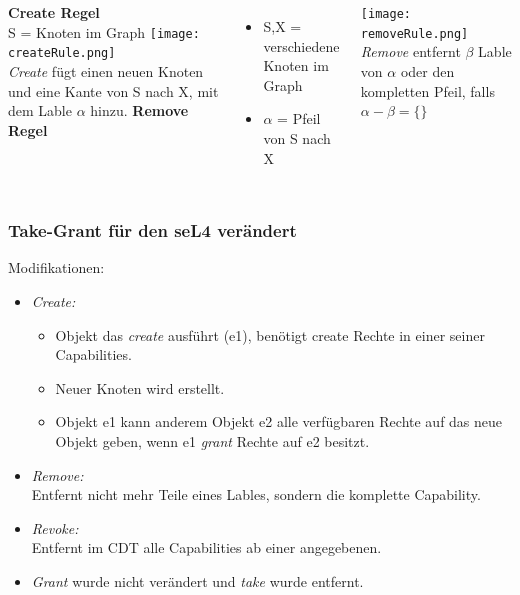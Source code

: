 \documentclass{beamer}
\begin{document}
\begin{frame}
\begin{columns}[t]
\textbf{Create Regel}\\
S = Knoten im Graph 
\texttt{[image: createRule.png]} \\
\textit{Create} fügt einen neuen Knoten und eine Kante von S nach X, mit dem Lable $\alpha$ hinzu.
\textbf{Remove Regel}
\begin{itemize}
\item S,X = verschiedene Knoten im Graph 
\item $\alpha$ = Pfeil von S nach X 
\end{itemize}
\texttt{[image: removeRule.png]} \\
\textit{Remove} entfernt $\beta$ Lable von $\alpha$ oder den kompletten Pfeil, falls $\alpha - \beta = \lbrace\rbrace$
\end{columns}
\end{frame}
\begin{frame}
\frametitle{{\small Take-Grant für den seL4 verändert}}
Modifikationen:
\begin{itemize}
\item \textit{Create:} 
\begin{itemize}
\item Objekt das \textit{create} ausführt (e1), benötigt create Rechte in einer seiner Capabilities.
\item Neuer Knoten wird erstellt.
\item Objekt e1 kann anderem Objekt e2 alle verfügbaren Rechte auf das neue Objekt geben, wenn e1 \textit{grant} Rechte auf e2 besitzt.
\end{itemize}
\item \textit{Remove:} \\
Entfernt nicht mehr Teile eines Lables, sondern die komplette Capability. 
\item \textit{Revoke:} \\
Entfernt im CDT alle Capabilities ab einer angegebenen.
\item \textit{Grant} wurde nicht verändert und \textit{take} wurde entfernt.
\end{itemize}
\end{frame}
\end{document}
